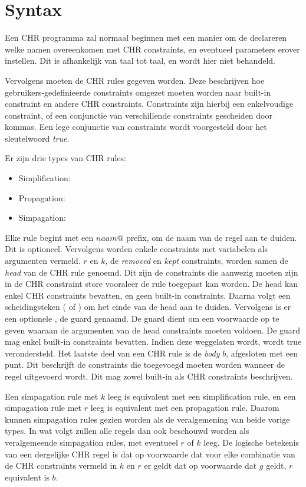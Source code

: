 \section{Syntax} \label{sec:chr-syntax}

Een CHR programma zal normaal beginnen met een manier om de declareren welke namen overeenkomen met CHR constraints, en eventueel parameters erover instellen. Dit is afhankelijk van taal tot taal, en wordt hier niet behandeld.

Vervolgens moeten de CHR rules gegeven worden. Deze beschrijven hoe gebruikers-gedefinieerde constraints omgezet moeten worden naar built-in constraint en andere CHR constraints. Constraints zijn hierbij een enkelvoudige constraint, of een conjunctie van verschillende constraints gescheiden door kommas. Een lege conjunctie van constraints wordt voorgesteld door het sleutelwoord {\em true}. 

Er zijn drie types van CHR rules: \begin{itemize}
\item Simplification: 
\item Propagation: 
\item Simpagation: 
\end{itemize}
Elke rule begint met een $ naam @ $ prefix, om de naam van de regel aan te duiden. Dit is optioneel. Vervolgens worden enkele constraints met variabelen als argumenten vermeld. $r$ en $k$, de {\em removed} en {\em kept} constraints, worden samen de {\em head} van de CHR rule genoemd. Dit zijn de constraints die aanwezig moeten zijn in de CHR constraint store vooraleer de rule toegepast kan worden. De head kan enkel CHR constraints bevatten, en geen built-in constraints. Daarna volgt een scheidingsteken (\code{<=>} of \code{==>}) om het einde van de head aan te duiden. Vervolgens is er een optionele , de guard genaamd. De guard dient om een voorwaarde op te geven waaraan de argumenten van de head constraints moeten voldoen. De guard mag enkel built-in constraints bevatten. Indien deze weggelaten wordt, wordt true verondersteld. Het laatste deel van een CHR rule is de {\em body} $b$, afgesloten met een punt. Dit beschrijft de constraints die toegevoegd moeten worden wanneer de regel uitgevoerd wordt. Dit mag zowel built-in als CHR constraints beschrijven.

Een simpagation rule met $k$ leeg is equivalent met een simplification rule, en een simpagation rule met $r$ leeg is equivalent met een propagation rule. Daarom kunnen simpagation rules gezien worden als de veralgemening van beide vorige types. In wat volgt zullen alle regels dan ook beschouwd worden als veralgemeende simpagation rules, met eventueel $r$ of $k$ leeg. De logische betekenis van een dergelijke CHR regel is dat op voorwaarde dat voor elke combinatie van de CHR constraints vermeld in $k$ en $r$ er geldt dat op voorwaarde dat $g$ geldt, $r$ equivalent is $b$.

